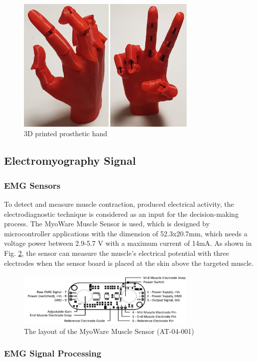 \documentclass[conference]{IEEEtran}
\begin{document}
\begin{figure}[h]
  \centering
  \includegraphics[width=3.4in]{3dhand3.jpg}
  \caption{3D printed prosthetic hand}
  \label{hand}
\end{figure}


\subsection{Electromyography Signal}

\subsubsection{EMG Sensors}

To detect and measure muscle contraction, produced electrical activity, the electrodiagnostic technique is considered as an input for the decision-making process. The MyoWare Muscle Sensor is used, which is designed by microcontroller applications \cite{myo} with the dimension of 52.3x20.7mm, which needs a voltage power between 2.9-5.7 V with a maximum current of 14mA. As shown in Fig. \ref{myo}, the sensor can measure the muscle's electrical potential with three electrodes when the sensor board is placed at the skin above the targeted muscle.

\begin{figure}[h]
  \centering
  \includegraphics[width=3.4in]{myosensor.png}
  \caption{The layout of the MyoWare Muscle Sensor (AT-04-001)}
  \label{myo}
\end{figure}


\subsubsection{EMG Signal Processing}
\end{document}
